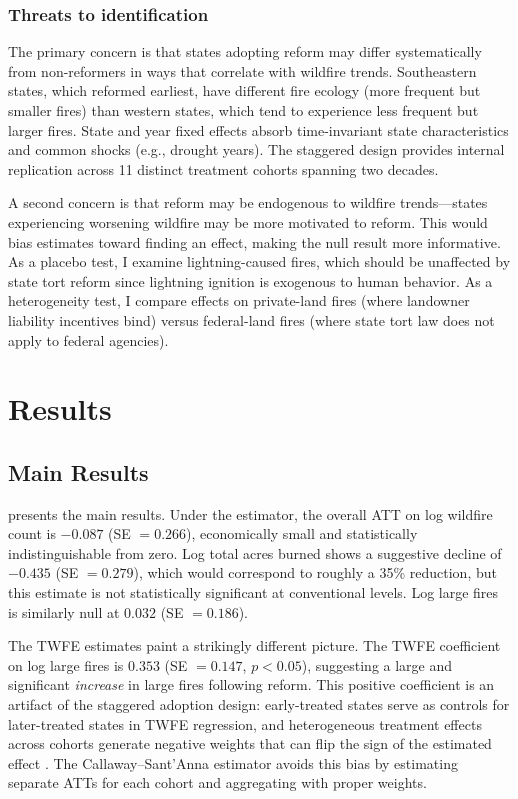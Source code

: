 \documentclass[12pt]{article}
\begin{document}
\subsubsection*{Threats to identification} The primary concern is that states adopting reform may differ systematically from non-reformers in ways that correlate with wildfire trends. Southeastern states, which reformed earliest, have different fire ecology (more frequent but smaller fires) than western states, which tend to experience less frequent but larger fires. State and year fixed effects absorb time-invariant state characteristics and common shocks (e.g., drought years). The staggered design provides internal replication across 11 distinct treatment cohorts spanning two decades.

A second concern is that reform may be endogenous to wildfire trends---states experiencing worsening wildfire may be more motivated to reform. This would bias estimates toward finding an effect, making the null result more informative. As a placebo test, I examine lightning-caused fires, which should be unaffected by state tort reform since lightning ignition is exogenous to human behavior. As a heterogeneity test, I compare effects on private-land fires (where landowner liability incentives bind) versus federal-land fires (where state tort law does not apply to federal agencies).

\section{Results}

\subsection{Main Results}

 presents the main results. Under the \citet{CallawayS2021} estimator, the overall ATT on log wildfire count is $-0.087$ (SE $= 0.266$), economically small and statistically indistinguishable from zero. Log total acres burned shows a suggestive decline of $-0.435$ (SE $= 0.279$), which would correspond to roughly a 35\% reduction, but this estimate is not statistically significant at conventional levels. Log large fires is similarly null at $0.032$ (SE $= 0.186$).

The TWFE estimates paint a strikingly different picture. The TWFE coefficient on log large fires is $0.353$ (SE $= 0.147$, $p < 0.05$), suggesting a large and significant \textit{increase} in large fires following reform. This positive coefficient is an artifact of the staggered adoption design: early-treated states serve as controls for later-treated states in TWFE regression, and heterogeneous treatment effects across cohorts generate negative weights that can flip the sign of the estimated effect \citep{GoodmanBacon2021}. The Callaway--Sant'Anna estimator avoids this bias by estimating separate ATTs for each cohort and aggregating with proper weights.
\end{document}
